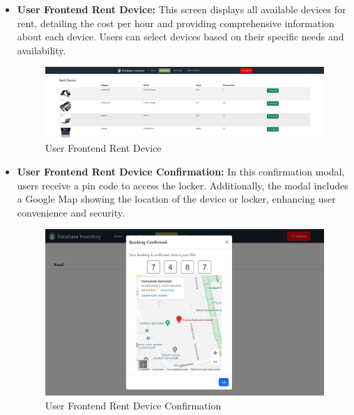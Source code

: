 \begin{itemize}
\item \textbf{User Frontend Rent Device:} This screen displays all available devices for rent, detailing the cost per hour and providing comprehensive information about each device. Users can select devices based on their specific needs and availability.
\begin{figure}[h]
    \centering
    \includegraphics[width=1\linewidth]{images/rent device.JPG}
    \caption{User Frontend Rent Device}
    \label{fig:rent-device-dashboard}
\end{figure}
\newpage
\item \textbf{User Frontend Rent Device Confirmation:} In this confirmation modal, users receive a pin code to access the locker. Additionally, the modal includes a Google Map showing the location of the device or locker, enhancing user convenience and security.
\begin{figure}[h]
    \centering
    \includegraphics[width=1\linewidth]{images/booking conf.JPG}
    \caption{User Frontend Rent Device Confirmation}
    \label{fig:rent-device-confirmation-modal}
\end{figure}


\end{itemize}
